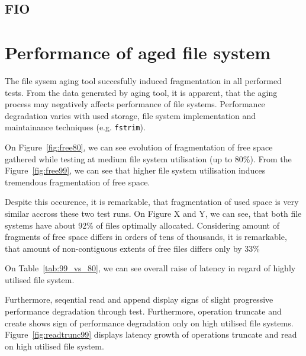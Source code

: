 \documentclass[
  color, %
  table, %
  lof,   %
  lot,   %
]{fithesis3}
\begin{document}
\subsection{FIO}

\section{Performance of aged file system}
The file sysem aging tool succesfully induced fragmentation in all performed tests. From the data generated by aging tool, it is apparent, that the aging process may negatively affects performance of file systems. Performance degradation varies with used storage, file system implementation and maintainance techniques (e.g. \texttt{fstrim}).

On Figure~\ref{fig:free80}, we can see evolution of fragmentation of free space gathered while testing at medium file system utilisation (up to 80\%). From the Figure~\ref{fig:free99}, we can see that higher file system utilisation induces tremendous fragmentation of free space.

Despite this occurence, it is remarkable, that fragmentation of used space is very similar accross these two test runs. On Figure X and Y, we can see, that both file systems have about 92\% of files optimally allocated. Considering amount of fragments of free space differs in orders of tens of thousands, it is remarkable, that amount of non-contiguous extents of free files differs only by 33\%

On Table~\ref{tab:99_vs_80}, we can see overall raise of latency in regard of highly utilised file system.

Furthermore, seqential read and append display signs of slight progressive performance degradation through test. Furthermore, operation truncate and create shows sign of performance degradation only on high utilised file systems. Figure~\ref{fig:readtrunc99} displays latency growth of operations truncate and read on high utilised file system.
\end{document}
